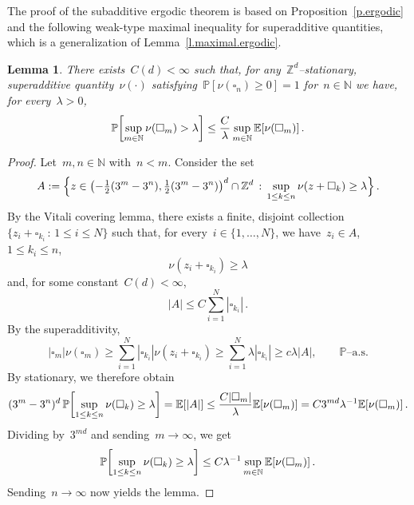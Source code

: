 \documentclass[11pt,twoside]{article} %
\let\oldsquare\square %
\renewcommand{\square}{\oldsquare}
\numberwithin{equation}{section}
\newtheorem{lemma}[theorem]{Lemma}
\theoremstyle{definition}
\let\originalleft\left
\let\originalright\right
\renewcommand{\left}{\mathopen{}\mathclose\bgroup\originalleft}
\renewcommand{\right}{\aftergroup\egroup\originalright}
\newcommand*{\N}{\ensuremath{\mathbb{N}}}
\newcommand*{\Zd}{\ensuremath{\mathbb{Z}^d}}
\newcommand{\cu}{\square}
\renewcommand{\P}{\mathbb{P}}
\newcommand{\E}{\mathbb{E}}
\begin{document}
The proof of the subadditive ergodic theorem is based on Proposition~\ref{p.ergodic} and the following weak-type maximal inequality for superadditive quantities, which is a generalization of Lemma~\ref{l.maximal.ergodic}.

\begin{lemma}
\label{l.maximal.superadditive}
There exists~$C(d)<\infty$ such that, for any~$\Zd$--stationary, superadditive quantity~$\nu(\cdot)$ satisfying~$\P [ \nu(\cu_n)\geq 0] = 1$ for~$n\in\N$ we have, for every~$\lambda>0$, 
\begin{align}
\label{e.maximal.superadditive}
\P \left[ \sup_{m\in\N} \nu(\cu_m) > \lambda \right] 
\leq 
\frac{C}{\lambda} 
\sup_{m\in\N} \E \left[ \nu(\cu_m) \right]
\,.
\end{align}
\end{lemma}
\begin{proof}

Let~$m,n \in\N$ with~$n<m$. Consider the set 
\begin{equation*}
A:=
\Bigl\{
z \in \left( -\tfrac12 (3^m-3^n) , \tfrac12 (3^m-3^n) \right)^d \cap \Zd \,:\, \sup_{1\leq k \leq n} \nu (z+\cu_k) \geq \lambda
\Bigr\}
\,.
\end{equation*}
By the Vitali covering lemma, there exists a finite, disjoint collection~$\{ z_i + \cu_{k_i} \,:\, 1\leq i \leq N\}$ such that, for every~$i\in \{1,\ldots,N\}$, we have~$z_i \in A$,~$1\leq k_i \leq n$, 
\begin{equation*}
\nu (z_i+\cu_{k_i}) \geq \lambda
\end{equation*}
and, for some constant~$C(d)<\infty$, 
\begin{equation*}
|A|
\leq C
\sum_{i=1}^N 
|\cu_{k_i}|
\,. 
\end{equation*}
By the superadditivity, 
\begin{equation*}
|\cu_m| \nu(\cu_m) 
\geq 
\sum_{i=1}^N 
|\cu_{k_i}| \nu(z_i + \cu_{k_i}) 
\geq 
\sum_{i=1}^N \lambda |\cu_{k_i}|  
\geq 
c \lambda |A|,\qquad \P\text{--a.s.}
\end{equation*}
By stationary, we therefore obtain
\begin{equation*}
(3^m-3^n)^{d} \,
\P \left[ \sup_{1\leq k \leq n} \nu(\cu_k) \geq \lambda \right]
=
\E\left[ |A| \right] 
\leq 
\frac{C|\cu_m| }{\lambda} \E \left[ \nu(\cu_m) \right]
= 
C 3^{md} \lambda^{-1} \E \left[ \nu(\cu_m) \right]
\,.
\end{equation*}
Dividing by~$3^{md}$ and sending~$m\to \infty$, we get 
\begin{equation*}
\P \left[ \sup_{1\leq k \leq n} \nu(\cu_k) \geq \lambda \right]
\leq
C \lambda^{-1}  \sup_{m\in\N} \E \left[ \nu(\cu_m) \right]
\,.
\end{equation*}
Sending~$n\to \infty$ now yields the lemma. 
\end{proof}
\end{document}
